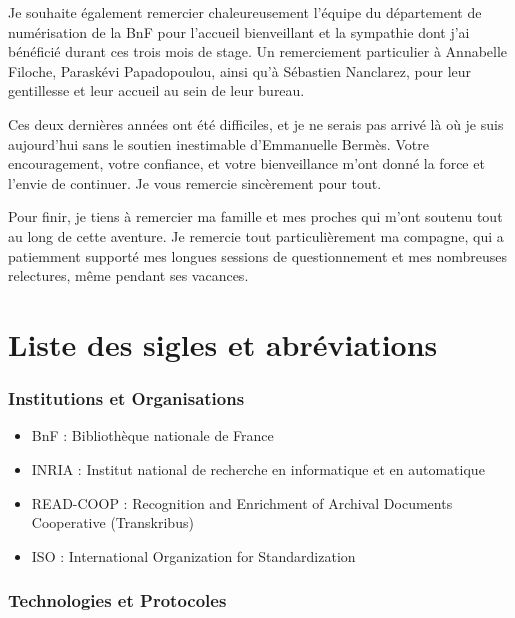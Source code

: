 \documentclass[a4paper,12pt,twoside]{book}
\begin{document}
Je souhaite également remercier chaleureusement l’équipe du département de numérisation de la BnF pour l’accueil bienveillant et la sympathie dont j’ai bénéficié durant ces trois mois de stage. Un remerciement particulier à Annabelle Filoche, Paraskévi Papadopoulou, ainsi qu’à Sébastien Nanclarez, pour leur gentillesse et leur accueil au sein de leur bureau.

Ces deux dernières années ont été difficiles, et je ne serais pas arrivé là où je suis aujourd’hui sans le soutien inestimable d’Emmanuelle Bermès. Votre encouragement, votre confiance, et votre bienveillance m’ont donné la force et l’envie de continuer. Je vous remercie sincèrement pour tout.

Pour finir, je tiens à remercier ma famille et mes proches qui m’ont soutenu tout au long de cette aventure. Je remercie tout particulièrement ma compagne, qui a patiemment supporté mes longues sessions de questionnement et mes nombreuses relectures, même pendant ses vacances.

\chapter{Liste des sigles et abréviations}

\subsection*{Institutions et Organisations}

\begin{itemize}
	\item BnF : Bibliothèque nationale de France 
	\item INRIA : Institut national de recherche en informatique et en automatique
	\item READ-COOP : Recognition and Enrichment of Archival Documents Cooperative  (Transkribus)
	\item ISO : International Organization for Standardization
\end{itemize}

\subsection*{Technologies et Protocoles}
\end{document}
